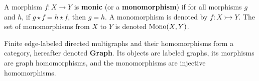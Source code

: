 \begin{definition}
    \label{def:cat:homo}
    A morphism \( f : X \to Y \) is \textbf{monic} (or a \textbf{monomorphism}) if for all morphisms \( g \) and \( h \), if \( g \star f = h \star f \), then \( g = h \). A monomorphism is denoted by \( f : X \rightarrowtail Y \). The set of monomorphisms from $X$ to $Y$ is denoted $\operatorname{Mono}(X,Y)$.
\end{definition} 

\begin{example} 
    Finite edge-labeled directed multigraphs and their homomorphisms form a category, hereafter denoted \textbf{Graph}. Its objects are labeled graphs, its morphisms are graph homomorphisms, and the monomorphisms are injective homomorphisms.
\end{example}

 

